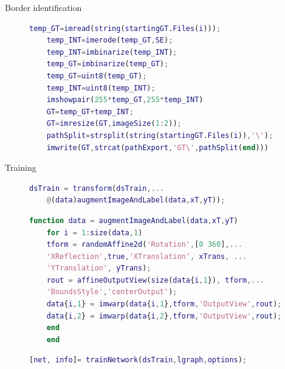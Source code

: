 \documentclass[aspectratio=169,xcolor=dvipsnames]{beamer}
\begin{document}
\begin{frame}[fragile]{Border identification}
\begin{figure}
\begin{minipage}{0.2\linewidth}
\end{minipage}\hfill
\begin{minipage}{0.55\linewidth}
	\tiny{\begin{lstlisting}[language=Matlab,basicstyle=\tiny]
	temp_GT=imread(string(startingGT.Files(i)));
	temp_INT=imerode(temp_GT,SE);
	temp_INT=imbinarize(temp_INT); 
	temp_GT=imbinarize(temp_GT);
	temp_GT=uint8(temp_GT);
	temp_INT=uint8(temp_INT);
	imshowpair(255*temp_GT,255*temp_INT)
	GT=temp_GT+temp_INT;
	GT=imresize(GT,imageSize(1:2));
	pathSplit=strsplit(string(startingGT.Files(i)),'\');
	imwrite(GT,strcat(pathExport,'GT\',pathSplit(end)))
\end{lstlisting}}
\end{minipage}
\end{figure}
\end{frame}

\begin{frame}[fragile]{Training}
	\begin{figure}
		\begin{minipage}{0.42\linewidth}
				\fontsize{3}{4}\selectfont{\def\svgwidth{\linewidth}
				}
				\fontsize{3}{4}
		\end{minipage}\hfill
	\begin{minipage}{0.53\linewidth}
	\tiny{\begin{lstlisting}[language=Matlab,basicstyle=\tiny]
	dsTrain = transform(dsTrain,...
	@(data)augmentImageAndLabel(data,xT,yT));
	\end{lstlisting}}
	\tiny{\begin{lstlisting}[language=Matlab,basicstyle=\tiny]
	function data = augmentImageAndLabel(data,xT,yT)
	for i = 1:size(data,1)
	tform = randomAffine2d('Rotation',[0 360],...
	'XReflection',true,'XTranslation', xTrans, ...
	'YTranslation', yTrans);
	rout = affineOutputView(size(data{i,1}), tform,...
	'BoundsStyle','centerOutput');
	data{i,1} = imwarp(data{i,1},tform,'OutputView',rout);
	data{i,2} = imwarp(data{i,2},tform,'OutputView',rout);
	end
	end	
\end{lstlisting}}
	\tiny{\begin{lstlisting}[language=Matlab,basicstyle=\tiny]
	[net, info]= trainNetwork(dsTrain,lgraph,options);
\end{lstlisting}}
\end{minipage}
	\end{figure}
\end{frame}
\end{document}
